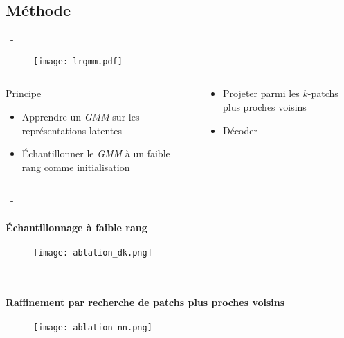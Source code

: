 \documentclass[aspectratio=169, 22pt]{beamer}
\begin{document}
\subsection{Méthode}
\begin{frame}{\secname~- \subsecname}
  \begin{figure}
    \texttt{[image: lrgmm.pdf]}
  \end{figure}
  \begin{columns}
    \begin{column}{0.5\linewidth}
      \begin{exampleblock}{Principe}
        \begin{itemize}
        \item \small Apprendre un \emph{GMM} sur les représentations latentes
        \item \small Échantillonner le \emph{GMM} à un faible rang comme initialisation
        \end{itemize}
      \end{exampleblock}
    \end{column}
    \begin{column}{0.5\linewidth}
        \begin{exampleblock}{}
        \begin{itemize}
        \item \small Projeter parmi les $k$-patchs plus proches voisins
        \item \small Décoder
        \end{itemize}
      \end{exampleblock}
    \end{column}
  \end{columns}
  
\end{frame}

\begin{frame}{\secname~- \subsecname}
  \framesubtitle{Échantillonnage à faible rang} 
  \begin{figure}
    \texttt{[image: ablation\_dk.png]}
  \end{figure}  
\end{frame}

\begin{frame}{\secname~- \subsecname}
  \framesubtitle{Raffinement par recherche de patchs plus proches voisins}
  \begin{figure}
    \texttt{[image: ablation\_nn.png]}
  \end{figure}    
\end{frame}
\end{document}
